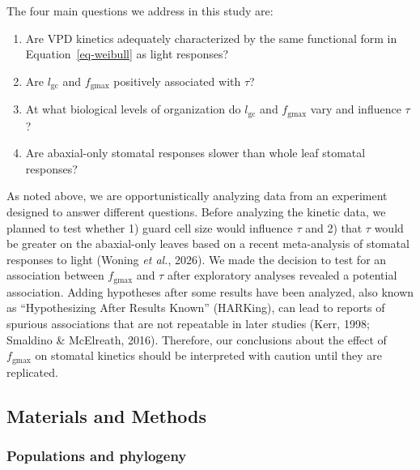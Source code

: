 \documentclass[
  letterpaper,
  DIV=11,
  numbers=noendperiod]{scrartcl}
\providecommand{\tightlist}{%
  \setlength{\itemsep}{0pt}\setlength{\parskip}{0pt}}
\newcommand{\fgmax}{$f_\mathrm{gmax}$}
\newcommand{\gcl}{$l_\mathrm{gc}$}
\begin{document}
The four main questions we address in this study are:

\begin{enumerate}
\def\labelenumi{\arabic{enumi}.}
\tightlist
\item
  Are VPD kinetics adequately characterized by the same functional form
  in Equation~\ref{eq-weibull} as light responses?
\item
  Are \gcl{} and \fgmax{} positively associated with \(\tau\)?
\item
  At what biological levels of organization do \gcl{} and \fgmax{} vary
  and influence \(\tau\)?
\item
  Are abaxial-only stomatal responses slower than whole leaf stomatal
  responses?
\end{enumerate}

As noted above, we are opportunistically analyzing data from an
experiment designed to answer different questions. Before analyzing the
kinetic data, we planned to test whether 1) guard cell size would
influence \(\tau\) and 2) that \(\tau\) would be greater on the
abaxial-only leaves based on a recent meta-analysis of stomatal
responses to light (Woning \emph{et al.}, 2026). We made the decision to
test for an association between \fgmax{} and \(\tau\) after exploratory
analyses revealed a potential association. Adding hypotheses after some
results have been analyzed, also known as ``Hypothesizing After Results
Known'' (HARKing), can lead to reports of spurious associations that are
not repeatable in later studies (Kerr, 1998; Smaldino \& McElreath,
2016). Therefore, our conclusions about the effect of \fgmax{} on
stomatal kinetics should be interpreted with caution until they are
replicated.

\subsection{Materials and Methods}\label{sec-methods}

\subsubsection{Populations and
phylogeny}\label{populations-and-phylogeny}
\end{document}
